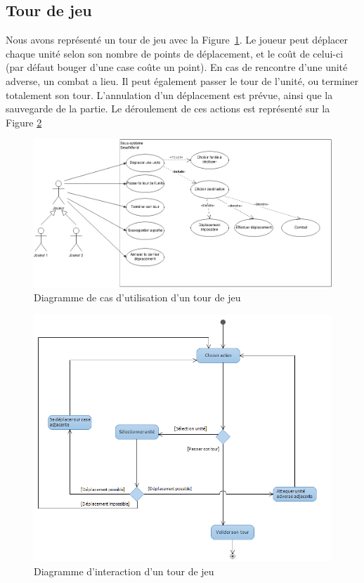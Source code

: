 \documentclass[a4paper]{article}
\begin{document}
\clearpage
	\subsection{Tour de jeu}
Nous avons représenté un tour de jeu avec la Figure~\ref{fig:cas_tour}. Le joueur peut déplacer chaque unité selon son nombre de points de déplacement, et le coût de celui-ci (par défaut bouger d'une case coûte un point). En cas de rencontre d'une unité adverse, un combat a lieu. Il peut également passer le tour de l'unité, ou terminer totalement son tour. L'annulation d'un déplacement est prévue, ainsi que la sauvegarde de la partie. Le déroulement de ces actions est représenté sur la Figure \ref{fig:inter_tour}

\begin{figure}[ht]
\centering
	\includegraphics[width=1\textwidth]{../Schemas/CU_Tour.png}
		\caption{Diagramme de cas d'utilisation d'un tour de jeu}
		\label{fig:cas_tour}
\end{figure}

\begin{figure}[ht]
\centering
	\includegraphics[width=1\textwidth]{../Schemas/Interaction_Tour.png}
		\caption{Diagramme d'interaction d'un tour de jeu}
		\label{fig:inter_tour}
\end{figure}
\clearpage
\end{document}
